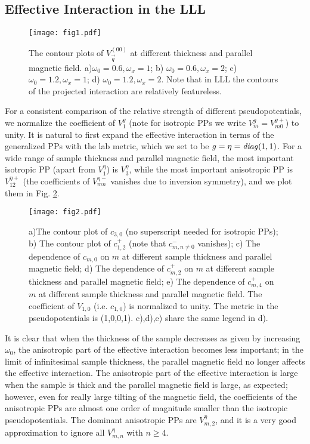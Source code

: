 \documentclass[twocolumn,showpacs,amsmath,amstex,amssymb,mathfonts,prb]{revtex4-1}
\begin{document}
\subsection{Effective Interaction in the LLL}\label{LLL_description}

\begin{figure}[htb]
\texttt{[image: fig1.pdf]}
\caption{The contour plots of $V_{\vec q}^{\left(00\right)}$ at different thickness and parallel magnetic field. a)$\omega_0=0.6,\omega_x=1$; b) $\omega_0=0.6,\omega_x=2$; c) $\omega_0=1.2,\omega_x=1$; d) $\omega_0=1.2,\omega_x=2$. Note that in LLL the contours of the projected interaction are relatively featureless.}
\label{contour_LLL}
\end{figure} 
For a consistent comparison of the relative strength of different pseudopotentials, we normalize the coefficient of $V_1^g$ (note for isotropic PPs we write $V^g_m=V^{g+}_{m0}$) to unity. It is natural to first expand the effective interaction in terms of the generalized PPs with the lab metric, which we set to be $g=\eta=\text{\textit{diag}}(1,1)$. For a wide range of sample thickness and parallel magnetic field, the most important isotropic PP (apart from $V^\eta_1$) is $V^\eta_3$, while the most important anisotropic PP is $V^{\eta+}_{12}$ (the coefficients of $V^{\eta-}_{mn}$ vanishes due to inversion symmetry), and we plot them in Fig. \ref{f1}. 
\begin{figure}[htb]
\texttt{[image: fig2.pdf]}
\caption{a)The contour plot of $c_{3,0}$ (no superscript needed for isotropic PPs); b) The contour plot of $c_{1,2}^+$ (note that $c_{m,n\neq 0}^-$ vanishes); c) The dependence of $c_{m,0}$ on $m$ at different sample thickness and parallel magnetic field; d) The dependence of $c_{m,2}^+$ on $m$ at different sample thickness and parallel magnetic field; e) The dependence of $c_{m,4}^+$ on $m$ at different sample thickness and parallel magnetic field. The coefficient of $V_{1,0}$ (i.e. $c_{1,0}$) is normalized to unity. The metric in the pseudopotentials is (1,0,0,1). c),d),e) share the same legend in d).}
\label{f1}
\end{figure}   
It is clear that when the thickness of the sample decreases as given by increasing $\omega_0$, the anisotropic part of the effective interaction becomes less important; in the limit of infinitesimal sample thickness, the parallel magnetic field no longer affects the effective interaction. The anisotropic part of the effective interaction is large when the sample is thick and the parallel magnetic field is large, as expected; however, even for really large tilting of the magnetic field, the coefficients of the anisotropic PPs are almost one order of magnitude smaller than the isotropic pseudopotentials. The dominant anisotropic PPs are $V^\eta_{m,2}$, and it is a very good approximation to ignore all $V^\eta_{m,n}$ with $n\ge 4$.
\end{document}
